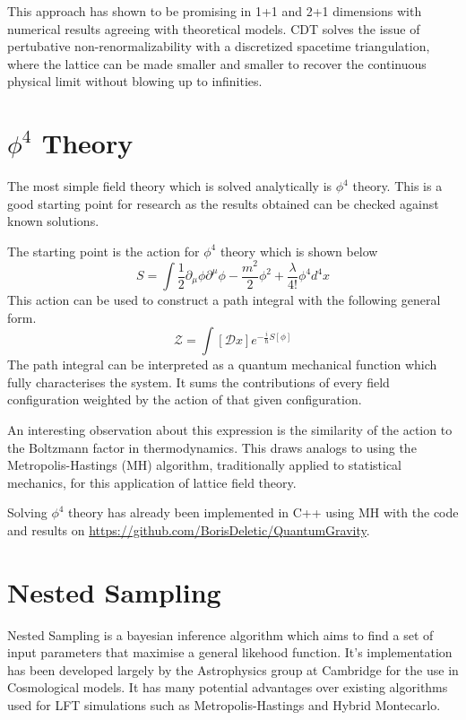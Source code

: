 \documentclass[a4paper]{article}
\begin{document}
    This approach has shown to be promising in 1+1 and 2+1 dimensions with numerical results agreeing with theoretical models. CDT solves the issue of pertubative non-renormalizability with a discretized spacetime triangulation, where the lattice can be made smaller and smaller to recover the continuous physical limit without blowing up to infinities. 

    \section{$ \phi^4$ Theory}
    The most simple field theory which is solved analytically is
    $\phi^4$ theory. This is a good starting point for research as the
    results obtained can be checked against known solutions.

    The starting point is the action for $\phi^4$ theory which is shown below
    $$S = \int{\frac{1}{2} \partial_{\mu} \phi \partial^{\mu} \phi
      -\frac{m^2}{2} \phi^2  + \frac{\lambda}{4!} \phi^4 d^4x}$$
    This action can be used to construct a path integral with the
    following general form.
    $$\mathcal{Z} = \int{ [\mathcal{D}x] e^{-\frac{i}{\hbar} S[\phi]
      } }$$
    The path integral can be interpreted as a quantum mechanical
    function which fully characterises the system. It sums the
    contributions of every field configuration weighted by the action
    of that given configuration.

    An interesting observation about this expression is the similarity
    of the action to the Boltzmann factor in thermodynamics. This
    draws analogs to using the Metropolis-Hastings (MH) algorithm,
    traditionally applied to statistical mechanics, for this application
    of lattice field theory.

    Solving $\phi^4$ theory has already been implemented in C++ using
    MH with the code and results on \url{https://github.com/BorisDeletic/QuantumGravity}.
    
    \section{Nested Sampling}
    Nested Sampling is a bayesian inference algorithm which aims to
    find a set of input parameters that maximise a general likehood function. 
    It's implementation has been
    developed largely by the Astrophysics group at Cambridge for the
    use in Cosmological models. It has many potential advantages over existing algorithms used for LFT
    simulations such as Metropolis-Hastings\cite{2} and Hybrid
    Montecarlo.
\end{document}
